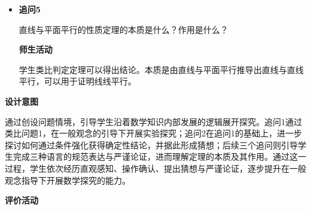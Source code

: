 \documentclass[UTF8,a4paper,12pt,twoside]{ctexart}
\begin{document}
\begin{enumerate}
\begin{itemize}
\textbf{师生活动}

学生自主完成。

（1）文字语言：一条直线与一个平面平行，如果过该直线的平面与此平面相交，那么该直线与交线平行。

（2）图形表示：如图所示。

（3）符号表示：$a\parallel\alpha$，$a\subset\beta$，$\alpha\cap\beta=b$，$\therefore a\parallel b$。

    \item \textbf{追问5}

直线与平面平行的性质定理的本质是什么？作用是什么？

\textbf{师生活动}

学生类比判定定理可以得出结论。本质是由直线与平面平行推导出直线与直线平行，可以用于证明线线平行。
\end{itemize}

\textbf{设计意图}

通过创设问题情境，引导学生沿着数学知识内部发展的逻辑展开探究。追问1通过类比问题1，在一般观念的引导下开展实验探究；追问2在追问1的基础上，进一步探讨如何通过条件强化获得确定性结论，并据此形成猜想；后续三个追问则引导学生完成三种语言的规范表达与严谨论证，进而理解定理的本质及其作用。通过这一过程，学生依次经历直观感知、操作确认、提出猜想与严谨论证，逐步提升在一般观念指导下开展数学探究的能力。

\textbf{评价活动}


\end{enumerate}
\end{document}
